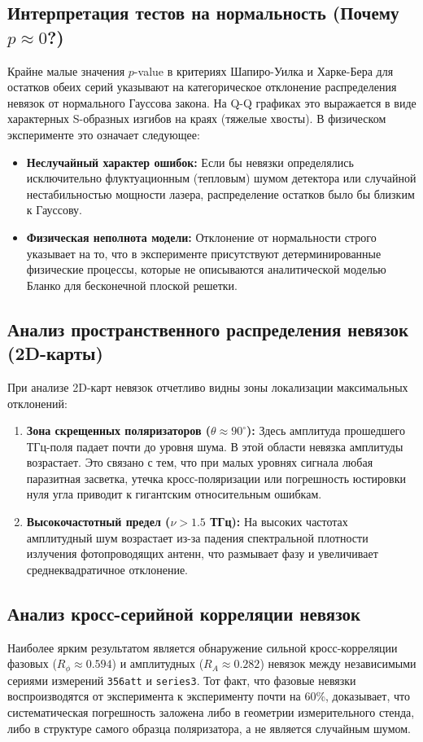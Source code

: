 \documentclass[12pt,a4paper]{article}
\begin{document}
\subsection{Интерпретация тестов на нормальность (Почему $p \approx 0$?)}
Крайне малые значения $p$-value в критериях Шапиро-Уилка и Харке-Бера для остатков обеих серий указывают на категорическое отклонение распределения невязок от нормального Гауссова закона. На Q-Q графиках это выражается в виде характерных S-образных изгибов на краях (тяжелые хвосты).
В физическом эксперименте это означает следующее:
\begin{itemize}
    \item \textbf{Неслучайный характер ошибок:} Если бы невязки определялись исключительно флуктуационным (тепловым) шумом детектора или случайной нестабильностью мощности лазера, распределение остатков было бы близким к Гауссову.
    \item \textbf{Физическая неполнота модели:} Отклонение от нормальности строго указывает на то, что в эксперименте присутствуют детерминированные физические процессы, которые не описываются аналитической моделью Бланко для бесконечной плоской решетки.
\end{itemize}

\subsection{Анализ пространственного распределения невязок (2D-карты)}
При анализе 2D-карт невязок отчетливо видны зоны локализации максимальных отклонений:
\begin{enumerate}
    \item \textbf{Зона скрещенных поляризаторов ($\theta \approx 90^\circ$):} Здесь амплитуда прошедшего ТГц-поля падает почти до уровня шума. В этой области невязка амплитуды возрастает. Это связано с тем, что при малых уровнях сигнала любая паразитная засветка, утечка кросс-поляризации или погрешность юстировки нуля угла приводит к гигантским относительным ошибкам.
    \item \textbf{Высокочастотный предел ($\nu > 1.5$ ТГц):} На высоких частотах амплитудный шум возрастает из-за падения спектральной плотности излучения фотопроводящих антенн, что размывает фазу и увеличивает среднеквадратичное отклонение.
\end{enumerate}

\subsection{Анализ кросс-серийной корреляции невязок}
Наиболее ярким результатом является обнаружение сильной кросс-корреляции фазовых ($R_\phi \approx 0.594$) и амплитудных ($R_A \approx 0.282$) невязок между независимыми сериями измерений \texttt{356att} и \texttt{series3}.
Тот факт, что фазовые невязки воспроизводятся от эксперимента к эксперименту почти на 60\%, доказывает, что систематическая погрешность заложена либо в геометрии измерительного стенда, либо в структуре самого образца поляризатора, а не является случайным шумом.
\end{document}
